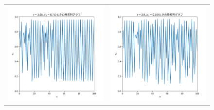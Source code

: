 \begin{figure}[htbp]
\begin{tabular}{cc}
    \begin{minipage}[t]{0.45\hsize}
      \centering
      \includegraphics[keepaspectratio, scale=0.3]{images/Problem1/ctest2_5_1.png}
    \end{minipage} &
    \begin{minipage}[t]{0.45\hsize}
      \centering
      \includegraphics[keepaspectratio, scale=0.3]{images/Problem1/ctest2_6_1.png}
    \end{minipage}
  \end{tabular}
\end{figure}

